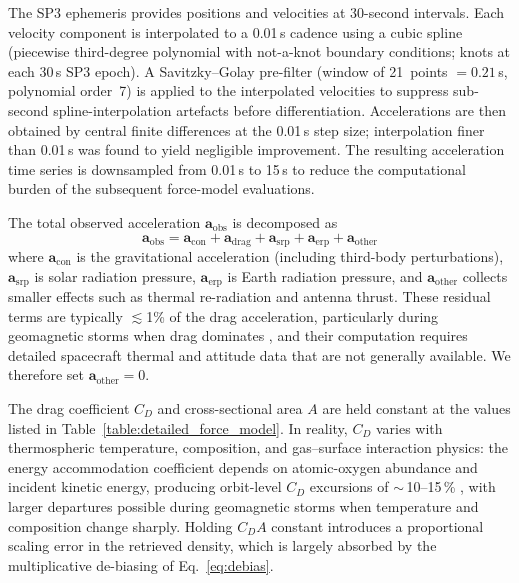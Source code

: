 \documentclass[draft]{agujournal2019}
\begin{document}
The SP3 ephemeris provides positions and velocities at 30-second intervals.
Each velocity component is interpolated to a 0.01\,s cadence using a cubic
spline (piecewise third-degree polynomial with not-a-knot boundary conditions;
knots at each 30\,s SP3 epoch). A Savitzky--Golay pre-filter (window of
21~points $= 0.21$\,s, polynomial order~7) is applied to the interpolated
velocities to suppress sub-second spline-interpolation artefacts before
differentiation. Accelerations are then obtained by central finite differences
at the 0.01\,s step size; interpolation finer than 0.01\,s was found to yield
negligible improvement. The resulting acceleration time series is downsampled
from 0.01\,s to 15\,s to reduce the computational burden of the subsequent
force-model evaluations.

The total observed acceleration $\mathbf{a}_{\text{obs}}$ is decomposed as
\begin{equation}
\mathbf{a}_{\text{obs}}
= \mathbf{a}_{\text{con}}
+ \mathbf{a}_{\text{drag}}
+ \mathbf{a}_{\text{srp}}
+ \mathbf{a}_{\text{erp}}
+ \mathbf{a}_{\text{other}}
\end{equation}
where $\mathbf{a}_{\text{con}}$ is the gravitational acceleration (including
third-body perturbations), $\mathbf{a}_{\text{srp}}$ is solar radiation
pressure, $\mathbf{a}_{\text{erp}}$ is Earth radiation pressure, and
$\mathbf{a}_{\text{other}}$ collects smaller effects such as thermal
re-radiation and antenna thrust. These residual terms are typically
$\lesssim$1\% of the drag acceleration, particularly during geomagnetic
storms when drag dominates
\cite{Bhattarai2022High-precisionSpacecraft, March2019CHAMPModelling,
Doornbos2010NeutralSatellites}, and their computation requires detailed
spacecraft thermal and attitude data that are not generally available. We
therefore set $\mathbf{a}_{\text{other}} = 0$.

The drag coefficient $C_D$ and cross-sectional area $A$ are held constant at
the values listed in Table~\ref{table:detailed_force_model}. In reality,
$C_D$ varies with thermospheric temperature, composition, and
gas--surface interaction physics: the energy accommodation coefficient
depends on atomic-oxygen abundance and incident kinetic energy, producing
orbit-level $C_D$ excursions of $\sim$\,10--15\,\%
\cite{Pilinski2013Semi-empiricalObjects, Mehta2014ModelingSurfaces},
with larger departures possible during geomagnetic storms when
temperature and composition change sharply. Holding
$C_D A$ constant introduces a proportional scaling error in the retrieved
density, which is largely absorbed by the multiplicative de-biasing of
Eq.~\eqref{eq:debias}.
\end{document}
